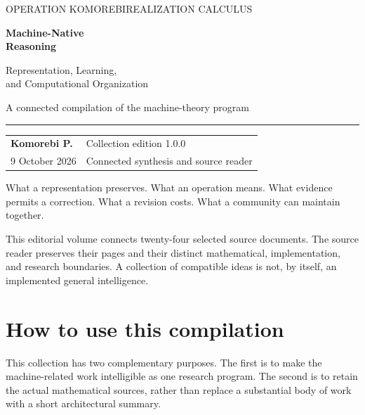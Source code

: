 \documentclass[11pt,oneside]{article}
\begin{document}
\begin{titlepage}
\thispagestyle{empty}
{\sffamily\small\color{Ink}OPERATION KOMOREBI\hfill REALIZATION CALCULUS}\par
\vspace{0.95in}
{\sffamily\fontsize{35}{39}\selectfont\bfseries\color{Ink}Machine-Native\\Reasoning\par}
\vspace{0.22in}
{\fontsize{21}{27}\selectfont Representation, Learning,\\and Computational Organization\par}
\vspace{0.36in}
{\large A connected compilation of the machine-theory program\par}
\vspace{0.20in}\rule{\linewidth}{0.6pt}
\vspace{0.15in}
\begin{tabularx}{\linewidth}{@{}X>{\raggedleft\arraybackslash}X@{}}
\textbf{Komorebi P.} & Collection edition 1.0.0\\
9 October 2026 & Connected synthesis and source reader
\end{tabularx}
\vfill
\begin{minipage}{0.94\linewidth}\raggedright
\large What a representation preserves. What an operation means. What evidence permits a correction. What a revision costs. What a community can maintain together.
\end{minipage}\par
\vspace{0.6in}
{\small This editorial volume connects twenty-four selected source documents. The source reader preserves their pages and their distinct mathematical, implementation, and research boundaries. A collection of compatible ideas is not, by itself, an implemented general intelligence.}
\end{titlepage}
{\small\setlength{\parskip}{0pt}\tableofcontents}
\clearpage
\section*{How to use this compilation}
This collection has two complementary purposes. The first is to make the machine-related work intelligible as one research program. The second is to retain the actual mathematical sources, rather than replace a substantial body of work with a short architectural summary.
\end{document}
